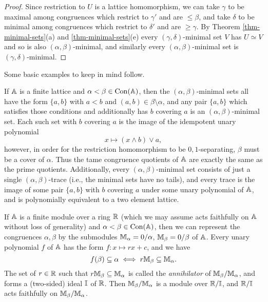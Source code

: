 \begin{appendices}
\begin{proof}
Since restriction to $U$ is a lattice homomorphism, we can take $\gamma$ to be maximal among congruences which restrict to $\gamma'$ and are $\le \beta$, and take $\delta$ to be minimal among congruences which restrict to $\delta'$ and are $\ge \gamma$. By Theorem \ref{thm-minimal-sets}(a) and \ref{thm-minimal-sets}(e) every $(\gamma,\delta)$-minimal set $V$ has $U \simeq V$ and so is also $(\alpha,\beta)$-minimal, and similarly every $(\alpha,\beta)$-minimal set is $(\gamma,\delta)$-minimal.
\end{proof}

Some basic examples to keep in mind follow.

\begin{ex} If $\mathbb{A}$ is a finite lattice and $\alpha < \beta \in \operatorname{Con}(\mathbb{A})$, then the $(\alpha,\beta)$-minimal sets all have the form $\{a,b\}$ with $a < b$ and $(a,b) \in \beta\setminus \alpha$, and any pair $\{a,b\}$ which satisfies those conditions and additionally has $b$ covering $a$ is an $(\alpha,\beta)$-minimal set. Each such set with $b$ covering $a$ is the image of the idempotent unary polynomial
\[
x \mapsto (x \wedge b) \vee a,
\]
however, in order for the restriction homomorphism to be $0,1$-separating, $\beta$ must be a cover of $\alpha$. Thus the tame congruence quotients of $\mathbb{A}$ are exactly the same as the prime quotients. Additionally, every $(\alpha,\beta)$-minimal set consists of just a single $(\alpha,\beta)$-trace (i.e., the minimal sets have no tails), and every trace is the image of some pair $\{a,b\}$ with $b$ covering $a$ under some unary polynomial of $\mathbb{A}$, and is polynomially equivalent to a two element lattice.
\end{ex}

\begin{ex} If $\mathbb{A}$ is a finite module over a ring $\mathbb{R}$ (which we may assume acts faithfully on $\mathbb{A}$ without loss of generality) and $\alpha < \beta \in \operatorname{Con}(\mathbb{A})$, then we can represent the congruences $\alpha,\beta$ by the submodules $\mathbb{M}_\alpha = 0/\alpha$, $\mathbb{M}_\beta = 0/\beta$ of $\mathbb{A}$. Every unary polynomial $f$ of $\mathbb{A}$ has the form $f : x \mapsto rx + c$, and we have
\[
f(\beta) \subseteq \alpha \iff r\mathbb{M}_\beta \subseteq \mathbb{M}_\alpha.
\]
The set of $r \in \mathbb{R}$ such that $r \mathbb{M}_\beta \subseteq \mathbb{M}_\alpha$ is called the \emph{annihilator} of $\mathbb{M}_\beta/\mathbb{M}_\alpha$, and forms a (two-sided) ideal $\mathbb{I}$ of $\mathbb{R}$. Then $\mathbb{M}_\beta/\mathbb{M}_\alpha$ is a module over $\mathbb{R}/\mathbb{I}$, and $\mathbb{R}/\mathbb{I}$ acts faithfully on $\mathbb{M}_\beta/\mathbb{M}_\alpha$.


\end{ex}
\end{appendices}
